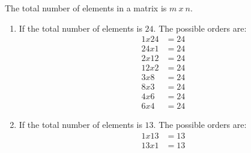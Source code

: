 The total number of elements in a matrix is $m\ x\ n$. \\
\begin{enumerate}
\item If the total number of elements is $24$. The possible orders are:
\begin{align}
1 x 24 &= 24\\
24 x 1 &= 24\\
2 x 12 &= 24\\
12 x 2 &= 24\\
3 x 8 &= 24\\
8 x 3 &= 24\\
4 x 6 &= 24\\
6 x 4 &= 24
\end{align}

\item If the total number of elements is $13$. The possible orders are:
\begin{align}
1 x 13 &= 13\\
13 x 1 &= 13
\end{align}
\end{enumerate}


